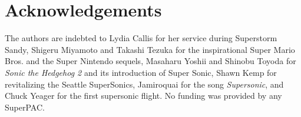 \section*{Acknowledgements}

The authors are indebted to Lydia Callis for her service during Superstorm Sandy, Shigeru Miyamoto and Takashi Tezuka for the inspirational Super Mario Bros.\cite{mario} and the Super Nintendo sequels, Masaharu Yoshii and Shinobu Toyoda for \textit{Sonic the Hedgehog 2}\cite{sonic2} and its introduction of Super Sonic, Shawn Kemp for revitalizing the Seattle SuperSonics, Jamiroquai for the song \emph{Supersonic}, and Chuck Yeager for the first supersonic flight.
No funding was provided by any SuperPAC.